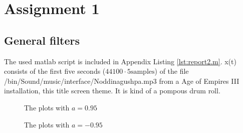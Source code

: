 \documentclass[final]{scrreprt} %
\begin{document}
\chapter{Assignment 1}
\label{ch:ass1}

\section{General filters}
The used matlab script is included in Appendix Listing \ref{lst:report2.m}.
x(t) consists of the first five seconds ($44100\cdot5 \mathrm{samples}$) of the file /bin/Sound/music/interface/Noddinagushpa.mp3 from a Age of Empires III installation, this title screen theme.
It is kind of a pompous drum roll.
\begin{figure}[H]
	\centering
    	\setlength\figureheight{3.5cm}
    	\setlength{}
    	    	
    	\caption{The plots with $a=0.95$}
    	\label{fig:a0.95-plots}
\end{figure}
\begin{figure}[H]
	\centering
    	\setlength\figureheight{3.5cm}
    	\setlength{}
    	    	
    	\caption{The plots with $a=-0.95$}
    	\label{fig:a0.-95-plots}
\end{figure}
\end{document}
